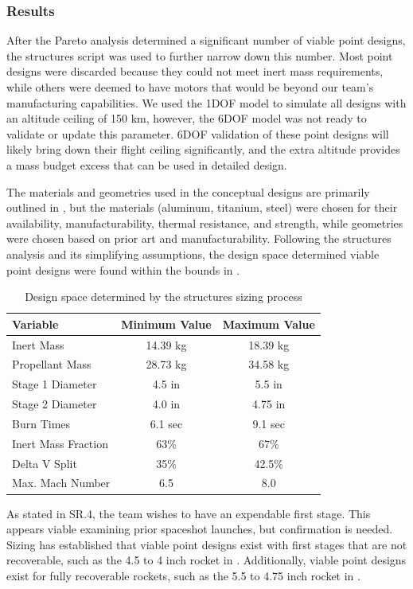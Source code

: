 \subsubsection{Results}
After the Pareto analysis determined a significant number of viable point designs, the structures script was used to further narrow down this number. Most point designs were discarded because they could not meet inert mass requirements, while others were deemed to have motors that would be beyond our team’s manufacturing capabilities. We used the 1DOF model to simulate all designs with an altitude ceiling of 150 km, however, the 6DOF model was not ready to validate or update this parameter. 6DOF validation of these point designs will likely bring down their flight ceiling significantly, and the extra altitude provides a mass budget excess that can be used in detailed design.

The materials and geometries used in the conceptual designs are primarily outlined in , but the materials (aluminum, titanium, steel) were chosen for their availability, manufacturability, thermal resistance, and strength, while geometries were chosen based on prior art and manufacturability. Following the structures analysis and its simplifying assumptions, the design space determined viable point designs were found within the bounds in .

\begin{table}
    \centering
    \begin{tabular}{l|c|c}
        \textbf{Variable} & \textbf{Minimum Value} & \textbf{Maximum Value} \\ \hline
        Inert Mass & 14.39 kg & 18.39 kg \\
        Propellant Mass & 28.73 kg & 34.58 kg \\
        Stage 1 Diameter & 4.5 in & 5.5 in \\
        Stage 2 Diameter & 4.0 in & 4.75 in \\
        Burn Times & 6.1 sec & 9.1 sec \\
        Inert Mass Fraction & 63\% & 67\% \\
        Delta V Split & 35\% & 42.5\% \\
        Max. Mach Number & 6.5 & 8.0
    \end{tabular}
    \caption{Design space determined by the structures sizing process}
    \label{table:sizing-bounds}
\end{table}

As stated in SR.4, the team wishes to have an expendable first stage. This appears viable examining prior spaceshot launches, but confirmation is needed. Sizing has established that viable point designs exist with first stages that are not recoverable, such as the 4.5 to 4 inch rocket in . Additionally, viable point designs exist for fully recoverable rockets, such as the 5.5 to 4.75 inch rocket in .


